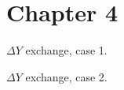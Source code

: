 \section{Chapter 4}

\begin{proposition}[4.4.5]
  \label{prop:4.4.5}
  $\Delta Y$ exchange, case 1.
\end{proposition}

\begin{proposition}[4.4.6]
  \label{prop:4.4.6}
  $\Delta Y$ exchange, case 2.
\end{proposition}
